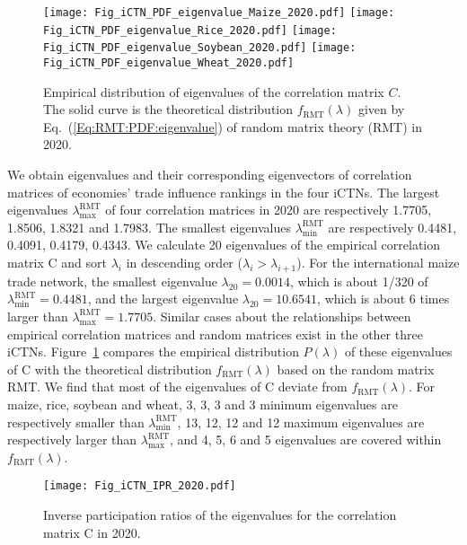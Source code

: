 \documentclass[preprint,3p,times,sort&compress]{elsarticle}
\begin{document}
 \begin{figure}[h!]
      \centering
      \texttt{[image: Fig\_iCTN\_PDF\_eigenvalue\_Maize\_2020.pdf]}
      \texttt{[image: Fig\_iCTN\_PDF\_eigenvalue\_Rice\_2020.pdf]}
      \texttt{[image: Fig\_iCTN\_PDF\_eigenvalue\_Soybean\_2020.pdf]}
      \texttt{[image: Fig\_iCTN\_PDF\_eigenvalue\_Wheat\_2020.pdf]}
      \caption{Empirical distribution of eigenvalues of the correlation matrix $C$. The solid curve is the theoretical distribution $f_{\mathrm{RMT}}(\lambda)$ given by Eq.~(\ref{Eq:RMT:PDF:eigenvalue}) of random matrix theory (RMT) in 2020.}
      \label{Fig:iCTN:PDF:eigenvalue:2020}
\end{figure}


We obtain eigenvalues and their corresponding eigenvectors of correlation matrices of economies' trade influence rankings in the four iCTNs. The largest eigenvalues $\lambda_{\max }^{\mathrm{RMT}}$ of four correlation matrices in 2020 are respectively 1.7705, 1.8506, 1.8321 and 1.7983. The smallest eigenvalues $\lambda_{\min }^{\mathrm{RMT}}$ are respectively 0.4481, 0.4091, 0.4179, 0.4343. We calculate 20 eigenvalues of the empirical correlation matrix $\mathrm{C}$ and sort $\lambda_{i}$ in descending order ($\lambda_i>\lambda_{i+1}$). For the international maize trade network, the smallest eigenvalue $\lambda_{20} = 0.0014$, which is about 1/320 of $\lambda_{\min }^{\mathrm{RMT}}=0.4481$, and the largest eigenvalue $\lambda_{20} = 10.6541$, which is about 6 times larger than $\lambda_{\max }^{\mathrm{RMT}}=1.7705$. Similar cases about the relationships between empirical correlation matrices and random matrices exist in the other three iCTNs. 
Figure~\ref{Fig:iCTN:PDF:eigenvalue:2020} compares the empirical distribution $P(\lambda)$ of these eigenvalues of $\mathrm{C}$ with the theoretical distribution $f_{\mathrm{RMT}}(\lambda)$ based on the random matrix $\mathrm{RMT}$. We find that most of the eigenvalues of $\mathrm{C}$ deviate from $f_{\mathrm{RMT}}(\lambda)$. For maize, rice, soybean and wheat, 3, 3, 3 and 3 minimum eigenvalues are respectively smaller than $\lambda_{\min }^{\mathrm{RMT}}$, 13, 12, 12 and 12 maximum eigenvalues are respectively larger than $\lambda_{\max }^{\mathrm{RMT}}$, and 4, 5, 6 and 5 eigenvalues are covered within $f_{\mathrm{RMT}}(\lambda)$.



 \begin{figure}[h!]
      \centering
      \texttt{[image: Fig\_iCTN\_IPR\_2020.pdf]}
      \caption{Inverse participation ratios of the eigenvalues for the correlation matrix $\mathrm{C}$ in 2020.}
      \label{Fig:iCTN:IPR:2020}
\end{figure}
\end{document}
